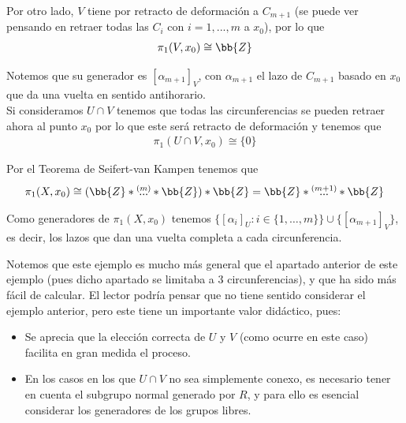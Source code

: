 \begin{ejemplo}
\begin{enumerate}
        Por otro lado, $V$ tiene por retracto de deformación a $C_{m+1}$ (se puede ver pensando en retraer todas las $C_i$ con $i=1,...,m$ a $x_0$), por lo que 
        \begin{gather*}
            \pi_1(V,x_0)\cong \bb{Z}
        \end{gather*}

        Notemos que su generador es $[\alpha_{m+1}]_V$, con $\alpha_{m+1}$ el lazo de $C_{m+1}$ basado en $x_0$ que da una vuelta en sentido antihorario.\\


        Si consideramos $U\cap V$ tenemos que todas las circunferencias se pueden retraer ahora al punto $x_0$ por lo que este será retracto de deformación y tenemos que
        \begin{gather*}
            \pi_1(U\cap V, x_0) \cong \{0\}
        \end{gather*}

        Por el Teorema de Seifert-van Kampen tenemos que 
        \begin{gather*}
            \pi_1(X,x_0) \cong (\bb{Z} \ast \overset{(m)}{...}\ast \bb{Z}) \ast \bb{Z} = \bb{Z} \ast \overset{(m+1)}{...}\ast \bb{Z}
        \end{gather*}

        Como generadores de $\pi_1(X,x_0)$ tenemos $\{[\alpha_i]_U : i\in \{1,\dots,m\}\} \cup \{[\alpha_{m+1}]_V\}$, es decir, los lazos que dan una vuelta completa a cada circunferencia.

        \begin{observacion}
            Notemos que este ejemplo es mucho más general que el apartado anterior de este ejemplo (pues dicho apartado se limitaba a $3$ circunferencias), y que ha sido más fácil de calcular. El lector podría pensar que no tiene sentido considerar el ejemplo anterior, pero este tiene un importante valor didáctico, pues:
            \begin{itemize}
                \item Se aprecia que la elección correcta de $U$ y $V$ (como ocurre en este caso) facilita en gran medida el proceso.
                \item En los casos en los que $U\cap V$ no sea simplemente conexo, es necesario tener en cuenta el subgrupo normal generado por $R$, y para ello es esencial considerar los generadores de los grupos libres.
            \end{itemize}
        \end{observacion}


\end{enumerate}
\end{ejemplo}
